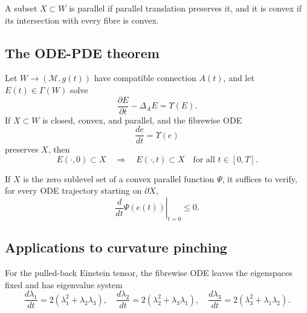 \begin{definition}
\label{topping-ch9-parallel-convex-subset}
A subset \(X\subset W\) is parallel if parallel translation preserves it, and
it is convex if its intersection with every fibre is convex.
\end{definition}

\subsection{The ODE-PDE theorem}

\begin{theorem}
\label{topping-ch9-ode-pde-theorem}

Let \(W\to(\mathcal M,g(t))\) have compatible connection \(A(t)\), and let
\(E(t)\in\Gamma(W)\) solve
\[
\frac{\partial E}{\partial t}-\Delta_AE=\Upsilon(E).
\]
If \(X\subset W\) is closed, convex, and parallel, and the fibrewise ODE
\[
\frac{de}{dt}=\Upsilon(e)
\]
preserves \(X\), then
\[
E(\mathord\cdot,0)\subset X\quad\Longrightarrow\quad
E(\mathord\cdot,t)\subset X\quad\text{for all }t\in[0,T].
\]
\end{theorem}

\begin{remark}
\label{topping-ch9-ode-pde-boundary-test}
If \(X\) is the zero sublevel set of a convex parallel function \(\Psi\), it
suffices to verify, for every ODE trajectory starting on \(\partial X\),
\[
\left.\frac{d}{dt}\Psi(e(t))\right|_{t=0}\le0.
\]
\end{remark}

\subsection{Applications to curvature pinching}

\begin{remark}
\label{topping-ch9-ode-eigenvalue-system}
For the pulled-back Einstein tensor, the fibrewise ODE leaves the eigenspaces
fixed and has eigenvalue system
\[
\frac{d\lambda_1}{dt}=2(\lambda_1^2+\lambda_2\lambda_3),\quad
\frac{d\lambda_2}{dt}=2(\lambda_2^2+\lambda_3\lambda_1),\quad
\frac{d\lambda_3}{dt}=2(\lambda_3^2+\lambda_1\lambda_2).
\]
\end{remark}


